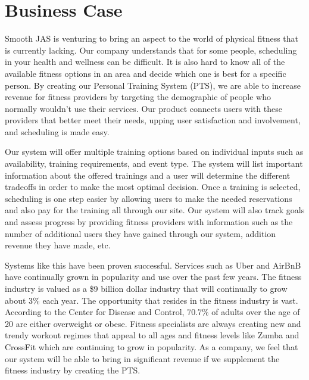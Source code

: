 \documentclass[12pt]{article}
\begin{document}
\section{Business Case}
Smooth JAS is venturing to bring an aspect to the world of physical fitness that is currently lacking. Our company understands that for some people, scheduling in your health and wellness can be difficult.  It is also hard to know all of the available fitness options in an area and decide which one is best for a specific person.  By creating our Personal Training System (PTS), we are able to increase revenue for fitness providers by targeting the demographic of people who normally wouldn’t use their services.  Our product connects users with these providers that better meet their needs, upping user satisfaction and involvement, and scheduling is made easy.

	Our system will offer multiple training options based on individual inputs such as availability, training requirements, and event type. The system will list important information about the offered trainings and a user will determine the different tradeoffs in order to make the most optimal decision. Once a training is selected, scheduling is one step easier by allowing users to make the needed reservations and also pay for the training all through our site.  Our system will also track goals and assess progress by providing fitness providers with information such as the number of additional users they have gained through our system, addition revenue they have made, etc. 

	Systems like this have been proven successful.  Services such as Uber and AirBnB have continually grown in popularity and use over the past few years. The fitness industry is valued as a \$9 billion dollar industry that will continually to grow about 3\% each year. The opportunity that resides in the fitness industry is vast. According to the Center for Disease and Control, 70.7\% of adults over the age of 20 are either overweight or obese. Fitness specialists are always creating new and trendy workout regimes that appeal to all ages and fitness levels like Zumba and CrossFit which are continuing to grow in popularity. As a company, we feel that our system will be able to bring in significant revenue if we supplement the fitness industry by creating the PTS.
\end{document}
